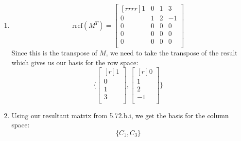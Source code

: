 \documentclass[12pt]{article}
\begin{document}
\begin{enumerate}
\begin{enumerate}
		\begin{enumerate}
		\item
		\[ \mathrm{rref}(M^T)=\begin{bmatrix}[rrrr]1&0&1&3\\0&1&2&-1\\0&0&0&0\\0&0&0&0\\0&0&0&0\\\end{bmatrix} \]
		Since this is the transpose of $M$, we need to take the transpose of the result which gives us our basis for the row space:
		\[ \{\begin{bmatrix}[r]1\\0\\1\\3\\\end{bmatrix},\begin{bmatrix}[r]0\\1\\2\\-1\\\end{bmatrix}\} \]
		\item Using our resultant matrix from 5.72.b.i, we get the basis for the column space:
		\[ \{C_1,C_3\} \]
		\end{enumerate}
	\end{enumerate}


\end{enumerate}
\end{document}
